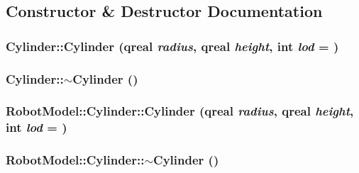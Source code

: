 \subsection{Constructor \& Destructor Documentation}
\hypertarget{class_robot_model_1_1_cylinder_aa738cca8df1e6a449662f33a814e67f8}{
\subsubsection[{Cylinder}]{\setlength{\rightskip}{0pt plus 5cm}Cylinder::Cylinder (qreal {\em radius}, \/  qreal {\em height}, \/  int {\em lod} = {})}}
\label{class_robot_model_1_1_cylinder_aa738cca8df1e6a449662f33a814e67f8}
\hypertarget{class_robot_model_1_1_cylinder_a05ab556f0ae3cd6e99d9d1f3caca80b3}{
\subsubsection[{$\sim$Cylinder}]{\setlength{\rightskip}{0pt plus 5cm}Cylinder::$\sim$Cylinder ()}}
\label{class_robot_model_1_1_cylinder_a05ab556f0ae3cd6e99d9d1f3caca80b3}
\hypertarget{class_robot_model_1_1_cylinder_a16c419bccd55814a38877eeb9b10f3c0}{
\subsubsection[{Cylinder}]{\setlength{\rightskip}{0pt plus 5cm}RobotModel::Cylinder::Cylinder (qreal {\em radius}, \/  qreal {\em height}, \/  int {\em lod} = {})}}
\label{class_robot_model_1_1_cylinder_a16c419bccd55814a38877eeb9b10f3c0}
\hypertarget{class_robot_model_1_1_cylinder_a18a0f743261694851bdbc50339f423f2}{
\subsubsection[{$\sim$Cylinder}]{\setlength{\rightskip}{0pt plus 5cm}RobotModel::Cylinder::$\sim$Cylinder ()}}
\label{class_robot_model_1_1_cylinder_a18a0f743261694851bdbc50339f423f2}


